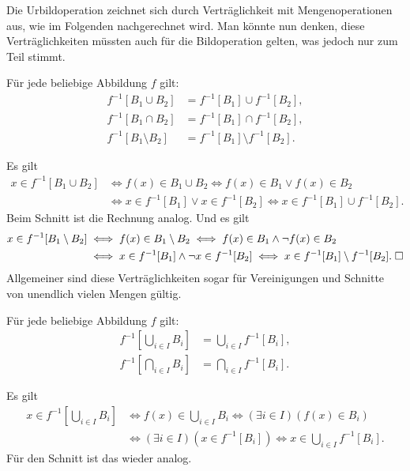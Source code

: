 \newpage

\noindent
Die Urbildoperation zeichnet sich durch Verträglichkeit mit
Mengenoperationen aus, wie im Folgenden nachgerechnet wird.
Man könnte nun denken, diese Verträglichkeiten müssten auch für
die Bildoperation gelten, was jedoch nur zum Teil stimmt.

\begin{Korollar}
Für jede beliebige Abbildung $f$ gilt:
\begin{align*}
f^{-1}[B_1\cup B_2] &= f^{-1}[B_1]\cup f^{-1}[B_2],\\
f^{-1}[B_1\cap B_2] &= f^{-1}[B_1]\cap f^{-1}[B_2],\\
f^{-1}[B_1\setminus B_2] &= f^{-1}[B_1]\setminus f^{-1}[B_2].
\end{align*}
\end{Korollar}
 Es gilt
\begin{align*}x\in f^{-1}[B_1\cup B_2] &\iff f(x)\in B_1\cup B_2
\iff f(x)\in B_1\lor f(x)\in B_2\\
&\iff x\in f^{-1}[B_1]\lor x\in f^{-1}[B_2]
\iff x\in f^{-1}[B_1]\cup f^{-1}[B_2].
\end{align*}
Beim Schnitt ist die Rechnung analog. Und es gilt
\begin{align*}
x\in f^{-1}[B_1\setminus B_2] &\iff f(x)\in B_1\setminus B_2
\iff f(x)\in B_1\land\neg f(x)\in B_2\\
&\iff x\in f^{-1}[B_1]\land\neg x\in f^{-1}[B_2]
\iff x\in f^{-1}[B_1]\setminus f^{-1}[B_2].\;\Box
\end{align*}
Allgemeiner sind diese Verträglichkeiten sogar für Vereinigungen
und Schnitte von unendlich vielen Mengen gültig.
\begin{Korollar}
Für jede beliebige Abbildung $f$ gilt:
\begin{align*}
f^{-1}[\bigcup_{i\in I} B_i] &= \bigcup_{i\in I} f^{-1}[B_i],\\
f^{-1}[\bigcap_{i\in I} B_i] &= \bigcap_{i\in I} f^{-1}[B_i].
\end{align*}
\end{Korollar}
 Es gilt
\begin{align*}
x\in f^{-1}[\bigcup_{i\in I} B_i]
&\iff f(x)\in \bigcup_{i\in I} B_i
\iff (\exists i\in I)(f(x)\in B_i)\\
&\iff (\exists i\in I)(x\in f^{-1}[B_i])
\iff x\in \bigcup_{i\in I} f^{-1}[B_i].
\end{align*}
Für den Schnitt ist das wieder analog.\;\qedsymbol

